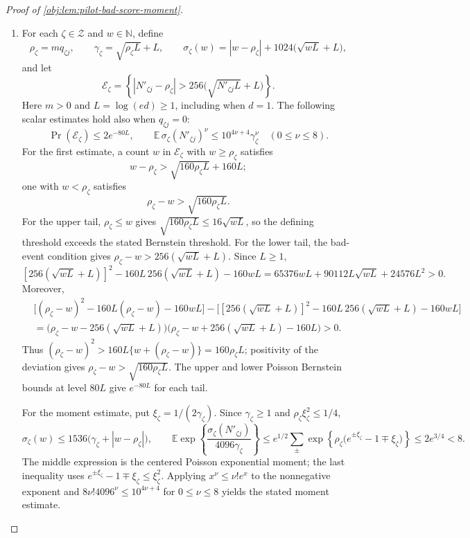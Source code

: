\begin{proof}[Proof of \cref{obj:lem:pilot-bad-score-moment}]
\begin{enumerate}
\item For each \(\zeta\in\mathcal Z\) and \(w\in\mathbb N\), define
\[
\rho_\zeta=mq_{\zeta j},\qquad
\gamma_\zeta=\sqrt{\rho_\zeta L}+L,\qquad
\sigma_\zeta(w)=|w-\rho_\zeta|+1024\bigl(\sqrt{wL}+L\bigr),
\]
and let
\[
\mathscr E_\zeta
=\left\{|N'_{\zeta j}-\rho_\zeta|
>256\bigl(\sqrt{N'_{\zeta j}L}+L\bigr)\right\}.
\]
Here \(m>0\) and \(L=\log(ed)\geq1\), including when \(d=1\). The following scalar estimates hold also when \(q_{\zeta j}=0\):
\[
\Pr(\mathscr E_\zeta)\leq 2e^{-80L},\qquad
\mathbb E\,\sigma_\zeta(N'_{\zeta j})^\nu
\leq 10^{4\nu+4}\gamma_\zeta^\nu
\quad(0\leq\nu\leq8).
\]
For the first estimate, a count \(w\) in \(\mathscr E_\zeta\) with \(w\geq\rho_\zeta\) satisfies
\[
w-\rho_\zeta>\sqrt{160\rho_\zeta L}+160L;
\]
one with \(w<\rho_\zeta\) satisfies
\[
\rho_\zeta-w>\sqrt{160\rho_\zeta L}.
\]
For the upper tail, \(\rho_\zeta\leq w\) gives \(\sqrt{160\rho_\zeta L}\leq16\sqrt{wL}\), so the defining threshold exceeds the stated Bernstein threshold. For the lower tail, the bad-event condition gives \(\rho_\zeta-w>256(\sqrt{wL}+L)\). Since \(L\geq1\),
\[
[256(\sqrt{wL}+L)]^2-160L\,256(\sqrt{wL}+L)-160wL
=65376wL+90112L\sqrt{wL}+24576L^2>0.
\]
Moreover,
\[
\begin{aligned}
&\bigl[(\rho_\zeta-w)^2-160L(\rho_\zeta-w)-160wL\bigr]
-\bigl[[256(\sqrt{wL}+L)]^2-160L\,256(\sqrt{wL}+L)-160wL\bigr]\\
&=\bigl(\rho_\zeta-w-256(\sqrt{wL}+L)\bigr)
\bigl(\rho_\zeta-w+256(\sqrt{wL}+L)-160L\bigr)>0.
\end{aligned}
\]
Thus \((\rho_\zeta-w)^2>160L\{w+(\rho_\zeta-w)\}=160\rho_\zeta L\); positivity of the deviation gives \(\rho_\zeta-w>\sqrt{160\rho_\zeta L}\). The upper and lower Poisson Bernstein bounds at level \(80L\) give \(e^{-80L}\) for each tail.

For the moment estimate, put \(\xi_\zeta=1/(2\gamma_\zeta)\). Since \(\gamma_\zeta\geq1\) and \(\rho_\zeta\xi_\zeta^2\leq1/4\),
\[
\sigma_\zeta(w)
\leq1536\bigl(\gamma_\zeta+|w-\rho_\zeta|\bigr),
\qquad
\mathbb E\exp\!\left\{
\frac{\sigma_\zeta(N'_{\zeta j})}{4096\gamma_\zeta}
\right\}
\leq
e^{1/2}\!\sum_{\pm}
\exp\!\left\{\rho_\zeta
\bigl(e^{\pm\xi_\zeta}-1\mp\xi_\zeta\bigr)\right\}
\leq 2e^{3/4}<8.
\]
The middle expression is the centered Poisson exponential moment; the last inequality uses
\(e^{\pm\xi_\zeta}-1\mp\xi_\zeta\leq\xi_\zeta^2\).
Applying \(x^\nu\leq\nu!e^x\) to the nonnegative exponent and
\(8\nu!4096^\nu\leq10^{4\nu+4}\) for \(0\leq\nu\leq8\) yields the stated moment estimate.


\end{enumerate}
\end{proof}
